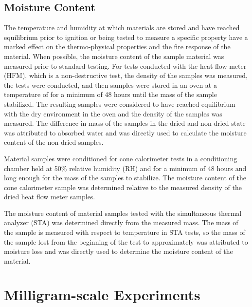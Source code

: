 \documentclass[12pt,oneside]{book}
\begin{document}
\subsection{Moisture Content}
\label{sec:moisture_content}

The temperature and humidity at which materials are stored and have reached equilibrium prior to ignition or being tested to measure a specific property have a marked effect on the thermo-physical properties and the fire response of the material. When possible, the moisture content of the sample material was measured prior to standard testing. For tests conducted with the heat flow meter (HFM), which is a non-destructive test, the density of the samples was measured, the tests were conducted, and then samples were stored in an oven at a temperature of  for a minimum of 48 hours until the mass of the sample stabilized. The resulting samples were considered to have reached equilibrium with the dry environment in the oven and the density of the samples was measured. The difference in mass of the samples in the dried and non-dried state was attributed to absorbed water and was directly used to calculate the moisture content of the non-dried samples.

Material samples were conditioned for cone calorimeter tests in a conditioning chamber held at 50\% relative humidity (RH) and  for a minimum of 48 hours and long enough for the mass of the samples to stabilize. The moisture content of the cone calorimeter sample was determined relative to the measured density of the dried heat flow meter samples.

The moisture content of material samples tested with the simultaneous thermal analyzer (STA) was determined directly from the measured mass. The mass of the sample is measured with respect to temperature in STA tests, so the mass of the sample lost from the beginning of the test to approximately  was attributed to moisture loss and was directly used to determine the moisture content of the material. 

\section{Milligram-scale Experiments}
\label{sec:mg_scale_exp}
\end{document}
